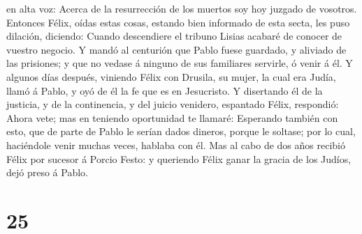 en alta voz: Acerca de la resurrección de los muertos soy hoy juzgado de
vosotros.  Entonces Félix, oídas estas cosas, estando
bien informado de esta secta, les puso dilación, diciendo: Cuando
descendiere el tribuno Lisias acabaré de conocer de vuestro negocio.
 Y mandó al centurión que Pablo fuese guardado, y
aliviado de las prisiones; y que no vedase á ninguno de sus familiares
servirle, ó venir á él.  Y algunos días después, viniendo
Félix con Drusila, su mujer, la cual era Judía, llamó á Pablo, y oyó de
él la fe que es en Jesucristo.  Y disertando él de la
justicia, y de la continencia, y del juicio venidero, espantado Félix,
respondió: Ahora vete; mas en teniendo oportunidad te llamaré:
 Esperando también con esto, que de parte de Pablo le
serían dados dineros, porque le soltase; por lo cual, haciéndole venir
muchas veces, hablaba con él.  Mas al cabo de dos años
recibió Félix por sucesor á Porcio Festo: y queriendo Félix ganar la
gracia de los Judíos, dejó preso á Pablo.

\hypertarget{section-24}{%
\section{25}\label{section-24}}

